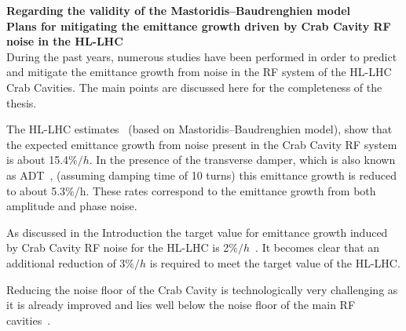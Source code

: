 \textbf{Regarding the validity of the Mastoridis--Baudrenghien model}\\


\textbf{Plans for mitigating the emittance growth driven by Crab Cavity RF noise in the HL-LHC}\\


During the past years, numerous studies have been performed in order to predict and mitigate the emittance growth from noise in the RF system of the HL-LHC Crab Cavities. The main points are discussed here for the completeness of the thesis.

The HL-LHC estimates~\cite{cc_noise_hl_lhc_estimates} (based on Mastoridis--Baudrenghien model), show that the expected emittance growth from noise present in the Crab Cavity RF system is about 15.4$\%/h$. In the presence of the transverse damper, which is also known as ADT~\cite{lhc_adt_info_presentation}, (assuming damping time of 10 turns) this emittance growth is reduced to about 5.3$\%$/h. These rates correspond to the emittance growth from both amplitude and phase noise. 


As discussed in the Introduction the target value for emittance growth induced by Crab Cavity RF noise for the HL-LHC is 2$\%/h$~\cite{MedinaMedrano:2301928, CC_lumi_limits_philippe, CC_lumi_limits_ilias}. It becomes clear that an additional reduction of 3$\%/h$ is required to meet the target value of the HL-LHC.

Reducing the noise floor of the Crab Cavity is technologically very challenging as it is already improved and lies well below the noise floor of the main RF cavities~\cite{cc_noise_hl_lhc_estimates}. %


